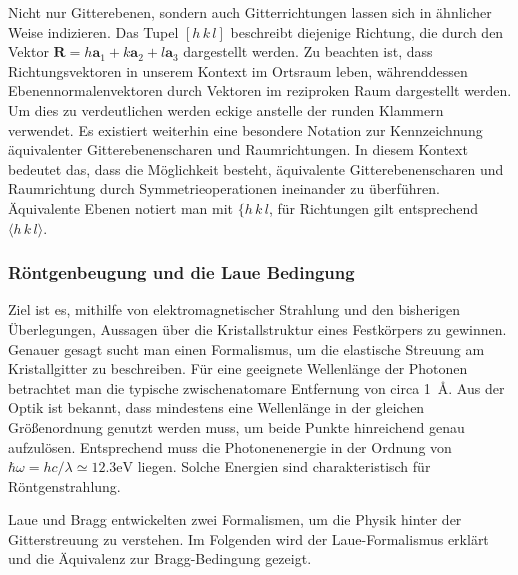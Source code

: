 Nicht nur Gitterebenen, sondern auch Gitterrichtungen lassen sich in ähnlicher Weise indizieren. Das Tupel
$[h\,k\,l]$ beschreibt diejenige Richtung, die durch den Vektor $\mathbf{R} = h\mathbf{a}_{1}+k\mathbf{a}_{2}+
l\mathbf{a}_{3}$ dargestellt werden. Zu beachten ist, dass Richtungsvektoren in unserem Kontext im Ortsraum leben, 
währenddessen Ebenennormalenvektoren durch Vektoren im reziproken Raum dargestellt werden. Um dies zu verdeutlichen werden 
eckige anstelle der runden Klammern verwendet. Es existiert weiterhin eine besondere Notation zur Kennzeichnung äquivalenter 
Gitterebenenscharen und Raumrichtungen. In diesem Kontext bedeutet das, dass die Möglichkeit besteht, äquivalente 
Gitterebenenscharen und Raumrichtung durch Symmetrieoperationen ineinander zu überführen. Äquivalente Ebenen notiert man 
mit $\{h \,k\, l $, für Richtungen gilt entsprechend $\langle h\, k \, l \rangle$.

\subsubsection{Röntgenbeugung und die Laue Bedingung}
Ziel ist es, mithilfe von elektromagnetischer Strahlung und den bisherigen Überlegungen, Aussagen über die Kristallstruktur 
eines Festkörpers zu gewinnen. Genauer gesagt sucht man einen Formalismus, um die elastische Streuung am Kristallgitter zu 
beschreiben. Für eine geeignete Wellenlänge der Photonen betrachtet man die typische zwischenatomare Entfernung von circa 
\qty{1}{\angstrom}. Aus der Optik ist bekannt, dass mindestens eine Wellenlänge in der gleichen Größenordnung genutzt werden 
muss, um beide Punkte hinreichend genau aufzulösen. Entsprechend muss die Photonenenergie in der Ordnung von 
$\hbar \omega=hc / \lambda \simeq 12.3 \mathrm{eV}$ liegen. Solche Energien sind charakteristisch für Röntgenstrahlung. 
\autocite[115]{Ashcroft}

Laue und Bragg entwickelten zwei Formalismen, um die Physik hinter der Gitterstreuung zu verstehen. Im Folgenden wird der 
Laue-Formalismus erklärt und die Äquivalenz zur Bragg-Bedingung gezeigt.

